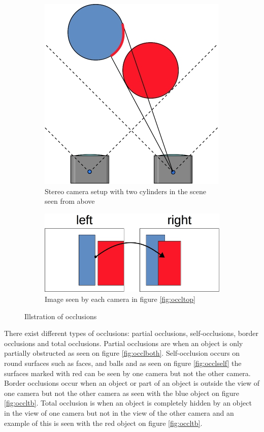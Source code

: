 \begin{figure}[ht]
  \centering
  \begin{subfigure}[t]{0.45\textwidth}
    \centering\includegraphics[scale=0.4]{figures/occltop.jpg}
    \caption{Stereo camera setup with two cylinders in the scene seen from above\label{fig:occltop}}
  \end{subfigure}\hspace{0.5cm}
  \begin{subfigure}[t]{0.45\textwidth}
    \centering\includegraphics[scale=0.4]{figures/occl2view}
    \caption{Image seen by each camera in figure \vref{fig:occltop}\label{fig:occl2view}}
  \end{subfigure}
  \caption{Illstration of occlusions\label{fig:occlboth}}
\end{figure}

There exist different types of occlusions: partial occlusions, self-occlusions, border occlusions and total occlusions. Partial occlusions are when an object is only partially obstructed as seen on figure \vref{fig:occlboth}. Self-occlusion occurs on round surfaces such as faces, and balls and as seen on figure \vref{fig:occlself} the surfaces marked with red can be seen by one camera but not the other camera. Border occlusions occur when an object or part of an object is outside the view of one camera but not the other camera as seen with the blue object on figure \ref{fig:occltb}. Total occlusion is when an object is completely hidden by an object in the view of one camera but not in the view of the other camera and an example of this is seen with the red object on figure \vref{fig:occltb}.\\

